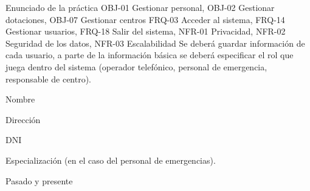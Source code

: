 {\reportauthors}
{Enunciado de la práctica}
{OBJ-01 Gestionar personal, OBJ-02 Gestionar dotaciones, OBJ-07 Gestionar centros}
{FRQ-03 Acceder al sistema, FRQ-14 Gestionar usuarios, FRQ-18 Salir del sistema, NFR-01 Privacidad, NFR-02 Seguridad de los datos, NFR-03 Escalabilidad}
{Se deberá guardar información de cada usuario, a parte de la información básica se deberá especificar el rol que juega dentro del sistema (operador telefónico, personal de emergencia, responsable de centro).}
{
\item{Nombre}
\item{Dirección}
\item{DNI}
\item{Especialización (en el caso del personal de emergencias).}
}
{Pasado y presente}

